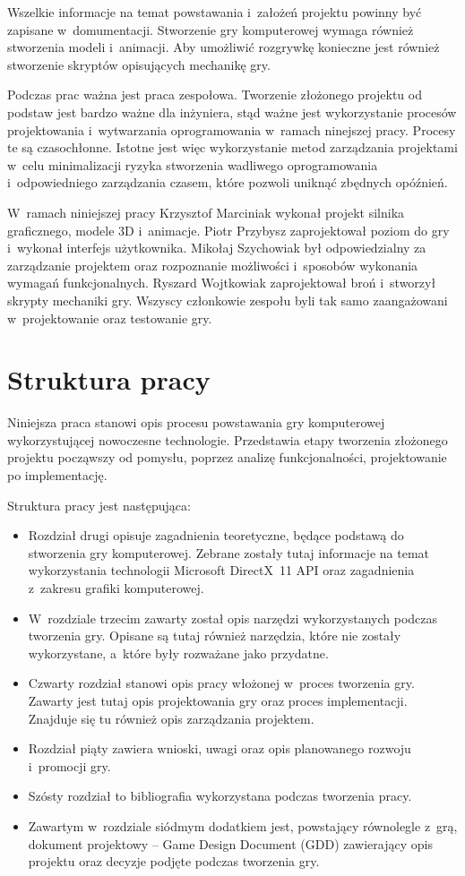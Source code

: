 Wszelkie informacje na temat  powstawania i~założeń projektu powinny być zapisane w~domumentacji. Stworzenie gry komputerowej wymaga również stworzenia modeli i~animacji. Aby umożliwić rozgrywkę konieczne jest również stworzenie skryptów opisujących mechanikę gry.  

Podczas prac ważna jest praca zespołowa. Tworzenie złożonego projektu od podstaw jest bardzo ważne dla inżyniera, stąd ważne jest wykorzystanie procesów projektowania i~wytwarzania oprogramowania w~ramach ninejszej pracy. Procesy te są czasochłonne. Istotne jest więc wykorzystanie metod zarządzania projektami w~celu minimalizacji ryzyka stworzenia wadliwego oprogramowania i~odpowiedniego zarządzania czasem, które pozwoli uniknąć zbędnych opóźnień. 

W~ramach niniejszej pracy Krzysztof Marciniak wykonał projekt silnika graficznego, modele 3D i~animacje. 
Piotr Przybysz zaprojektował poziom do gry i~wykonał interfejs użytkownika. 
Mikołaj Szychowiak był odpowiedzialny za zarządzanie projektem oraz rozpoznanie możliwości i~sposobów wykonania wymagań funkcjonalnych.
Ryszard Wojtkowiak zaprojektował broń i~stworzył skrypty mechaniki gry.
Wszyscy członkowie zespołu byli tak samo zaangażowani w~projektowanie oraz testowanie gry.

\section{Struktura pracy}
Niniejsza praca stanowi opis procesu powstawania gry komputerowej wykorzystującej nowoczesne technologie. Przedstawia etapy tworzenia złożonego projektu począwszy od pomysłu, poprzez analizę funkcjonalności, projektowanie po implementację. 

Struktura pracy jest następująca:
\begin{itemize}
\item Rozdział drugi opisuje zagadnienia teoretyczne, będące podstawą do stworzenia gry komputerowej. Zebrane zostały tutaj informacje na temat wykorzystania technologii Microsoft DirectX~11 API oraz zagadnienia z~zakresu grafiki komputerowej.
\item W~rozdziale trzecim zawarty został opis narzędzi wykorzystanych podczas tworzenia gry. Opisane są tutaj również narzędzia, które nie zostały wykorzystane, a~które były rozważane jako przydatne. 
\item Czwarty rozdział stanowi opis pracy włożonej w~proces tworzenia gry. Zawarty jest tutaj opis projektowania gry oraz proces implementacji. Znajduje się tu również opis zarządzania projektem.
\item Rozdział piąty zawiera wnioski, uwagi oraz opis planowanego rozwoju i~promocji gry.
\item Szósty rozdział to bibliografia wykorzystana podczas tworzenia pracy.
\item Zawartym w~rozdziale siódmym dodatkiem jest, powstający równolegle z~grą, dokument projektowy -- Game Design Document (GDD) zawierający opis projektu oraz decyzje podjęte podczas tworzenia gry.
\end{itemize}